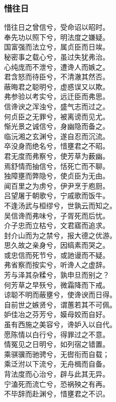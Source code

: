\documentclass[]{article}
\begin{document}
\hypertarget{header-n2871}{%
\subsubsection{惜往日}\label{header-n2871}}

惜往日之曾信兮，受命诏以昭时。\\
奉先功以照下兮，明法度之嫌疑。\\
国富强而法立兮，属贞臣而日竢。\\
秘密事之载心兮，虽过失犹弗治。\\
心纯庞而不泄兮，遭谗人而嫉之。\\
君含怒而待臣兮，不清澈其然否。\\
蔽晦君之聪明兮，虚惑误又以欺。\\
弗参验以考实兮，远迁臣而弗思。\\
信谗谀之浑浊兮，盛气志而过之。\\
何贞臣之无罪兮，被离谤而见尤。\\
惭光景之诚信兮，身幽隐而备之。\\
临沅湘之玄渊兮，遂自忍而沉流。\\
卒没身而绝名兮，惜壅君之不昭。\\
君无度而弗察兮，使芳草为薮幽。\\
焉舒情而抽信兮，恬死亡而不聊。\\
独障壅而弊隐兮，使贞臣为无由。\\
闻百里之为虏兮，伊尹烹于庖厨。\\
吕望屠于朝歌兮，宁戚歌而饭牛。\\
不逢汤武与桓缪兮，世孰云而知之。\\
吴信谗而弗味兮，子胥死而后忧。\\
介子忠而立枯兮，文君寤而追求。\\
封介山而为之禁兮，报大德之优游。\\
思久故之亲身兮，因缟素而哭之。\\
或忠信而死节兮，或訑谩而不疑。\\
弗省察而按实兮，听谗人之虚辞。\\
芳与泽其杂糅兮，孰申旦而别之？\\
何芳草之早殀兮，微霜降而下戒。\\
谅聪不明而蔽壅兮，使谗谀而日得。\\
自前世之嫉贤兮，谓蕙若其不可佩。\\
妒佳冶之芬芳兮，嫫母姣而自好。\\
虽有西施之美容兮，谗妒入以自代。\\
愿陈情以白行兮，得罪过之不意。\\
情冤见之日明兮，如列宿之错置。\\
乘骐骥而驰骋兮，无辔衔而自载；\\
乘泛泭以下流兮，无舟楫而自备。\\
背法度而心治兮，辟与此其无异。\\
宁溘死而流亡兮，恐祸殃之有再。\\
不毕辞而赴渊兮，惜壅君之不识。
\end{document}
